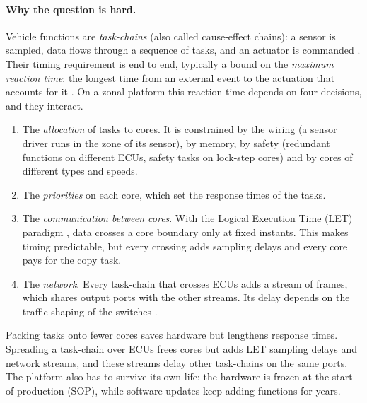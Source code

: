 \paragraph{Why the question is hard.} Vehicle functions are
\emph{task-chains} (also called cause-effect chains): a sensor is sampled,
data flows through a sequence of tasks, and an actuator is commanded
\cite{feiertag2008compositional,kramer2015waters}. Their timing
requirement is end to end, typically a bound on the \emph{maximum reaction
time}: the longest time from an external event to the actuation that
accounts for it \cite{feiertag2008compositional,durr2019end,
gunzel2023equivalence}.
On a zonal platform this reaction time depends on four decisions, and they
interact.
\begin{enumerate}[label=(\roman*)]
\item The \emph{allocation} of tasks to cores. It is constrained by the
wiring (a sensor driver runs in the zone of its sensor), by memory, by
safety (redundant functions on different ECUs, safety tasks on lock-step
cores) and by cores of different types and speeds.
\item The \emph{priorities} on each core, which set the response times of
the tasks.
\item The \emph{communication between cores}. With the Logical Execution
Time (LET) paradigm \cite{kirsch2012let,hamann2017communication,
biondi2018achieving}, data crosses a core boundary only at fixed instants.
This makes timing predictable, but every crossing adds sampling delays and
every core pays for the copy task.
\item The \emph{network}. Every task-chain that crosses ECUs adds a stream
of frames, which shares output ports with the other streams. Its delay
depends on the traffic shaping of the switches \cite{ieee8021q2022,
zhao2022quantitative}.
\end{enumerate}
Packing tasks onto fewer cores saves hardware but lengthens response
times. Spreading a task-chain over ECUs frees cores but adds LET sampling
delays and network streams, and these streams delay other task-chains on
the same ports. The platform also has to survive its own life: the
hardware is frozen at the start of production (SOP), while software
updates keep adding functions for years.

